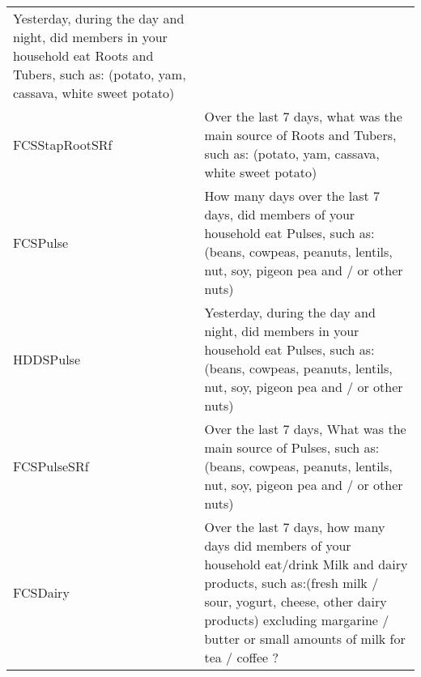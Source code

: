 \documentclass[
]{article}
\begin{document}
\begin{longtable}[]{@{}ll@{}}
\begin{minipage}[t]{0.72\columnwidth}
Yesterday, during the day and night, did members in your household eat Roots and Tubers, such as: (potato, yam, cassava, white sweet potato)\strut
\end{minipage}\tabularnewline
\begin{minipage}[t]{0.22\columnwidth}\raggedright
FCSStapRootSRf\strut
\end{minipage} & \begin{minipage}[t]{0.72\columnwidth}\raggedright
Over the last 7 days, what was the main source of Roots and Tubers, such as: (potato, yam, cassava, white sweet potato)\strut
\end{minipage}\tabularnewline
\begin{minipage}[t]{0.22\columnwidth}\raggedright
FCSPulse\strut
\end{minipage} & \begin{minipage}[t]{0.72\columnwidth}\raggedright
How many days over the last 7 days, did members of your household eat Pulses, such as: (beans, cowpeas, peanuts, lentils, nut, soy, pigeon pea and / or other nuts)\strut
\end{minipage}\tabularnewline
\begin{minipage}[t]{0.22\columnwidth}\raggedright
HDDSPulse\strut
\end{minipage} & \begin{minipage}[t]{0.72\columnwidth}\raggedright
Yesterday, during the day and night, did members in your household eat Pulses, such as: (beans, cowpeas, peanuts, lentils, nut, soy, pigeon pea and / or other nuts)\strut
\end{minipage}\tabularnewline
\begin{minipage}[t]{0.22\columnwidth}\raggedright
FCSPulseSRf\strut
\end{minipage} & \begin{minipage}[t]{0.72\columnwidth}\raggedright
Over the last 7 days, What was the main source of Pulses, such as: (beans, cowpeas, peanuts, lentils, nut, soy, pigeon pea and / or other nuts)\strut
\end{minipage}\tabularnewline
\begin{minipage}[t]{0.22\columnwidth}\raggedright
FCSDairy\strut
\end{minipage} & \begin{minipage}[t]{0.72\columnwidth}\raggedright
Over the last 7 days, how many days did members of your household eat/drink Milk and dairy products, such as:(fresh milk / sour, yogurt, cheese, other dairy products) excluding margarine / butter or small amounts of milk for tea / coffee ?\strut

\end{minipage}
\end{longtable}
\end{document}
